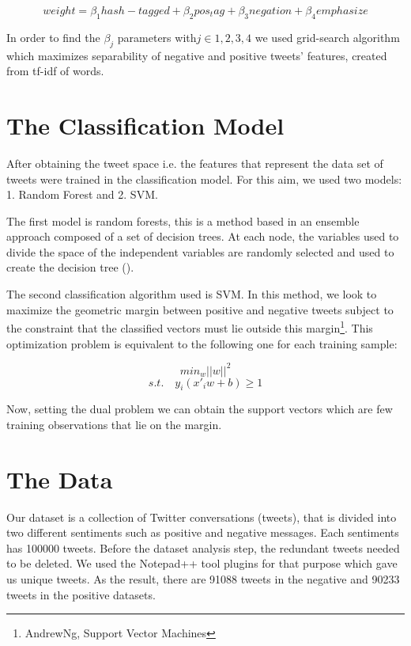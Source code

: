 \documentclass[10pt,conference,compsocconf]{IEEEtran}
\begin{document}
$$weight=\beta_1hash-tagged+\beta_2pos_tag+\beta_3negation+\beta_4emphasize$$

In order to find the $\beta_j$ parameters with$ j\in {1,2,3,4}$ we used grid-search algorithm which maximizes separability of negative and positive tweets' features, created from tf-idf of words.

\section{The Classification Model}\label{s4}
After obtaining the tweet space i.e. the features that represent the data set of tweets were trained in the classification model. For this aim, we used two models: 1. Random Forest and 2. SVM. 

The first model is random forests, this is a method based in an ensemble approach composed of a set of decision trees. At each node, the variables used to divide the space of the independent variables are randomly selected and used to create the decision tree (\cite{breiman2001random}). 

The second classification algorithm used is SVM. In this method, we look to maximize the geometric margin between positive and negative tweets subject to the constraint that the classified vectors must lie outside this margin\footnote{AndrewNg, Support Vector Machines}. This optimization problem is equivalent to the following one for each training sample:

$$min_w || w ||^2$$
$$s.t. \quad y_i(x'_iw +b)\geq 1$$

 Now, setting the dual problem we can obtain the support vectors which are few training observations that lie on the margin. 
 


\section{The Data}\label{s5}
\label{S3}

Our dataset is a collection of Twitter conversations (tweets), that is divided into two different sentiments such as positive and negative messages. Each sentiments has 100000 tweets. Before the dataset analysis step, the redundant tweets needed to be deleted. We used the Notepad++ tool plugins for that purpose which gave us unique tweets. As the result, there are 91088 tweets in the negative and 90233 tweets in the positive datasets.
 
\end{document}
